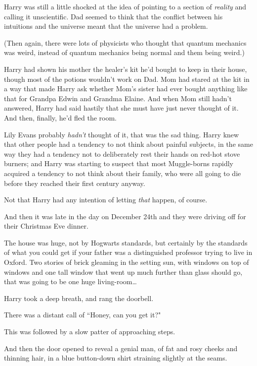 Harry was still a little shocked at the idea of pointing to a section of \emph{reality} and calling it unscientific. Dad seemed to think that the conflict between his intuitions and the universe meant that the universe had a problem.

(Then again, there were lots of physicists who thought that quantum mechanics was weird, instead of quantum mechanics being normal and them being weird.)

Harry had shown his mother the healer's kit he'd bought to keep in their house, though most of the potions wouldn't work on Dad. Mom had stared at the kit in a way that made Harry ask whether Mom's sister had ever bought anything like that for Grandpa Edwin and Grandma Elaine. And when Mom still hadn't answered, Harry had said hastily that she must have just never thought of it. And then, finally, he'd fled the room.

Lily Evans probably \emph{hadn't} thought of it, that was the sad thing. Harry knew that other people had a tendency to not think about painful subjects, in the same way they had a tendency not to deliberately rest their hands on red-hot stove burners; and Harry was starting to suspect that most Muggle-borns rapidly acquired a tendency to not think about their family, who were all going to die before they reached their first century anyway.

Not that Harry had any intention of letting \emph{that} happen, of course.

And then it was late in the day on December 24th and they were driving off for their Christmas Eve dinner.

\later

The house was huge, not by Hogwarts standards, but certainly by the standards of what you could get if your father was a distinguished professor trying to live in Oxford. Two stories of brick gleaming in the setting sun, with windows on top of windows and one tall window that went up much further than glass should go, that was going to be one huge living-room{\ldots}

Harry took a deep breath, and rang the doorbell.

There was a distant call of ``Honey, can you get it?"

This was followed by a slow patter of approaching steps.

And then the door opened to reveal a genial man, of fat and rosy cheeks and thinning hair, in a blue button-down shirt straining slightly at the seams.

